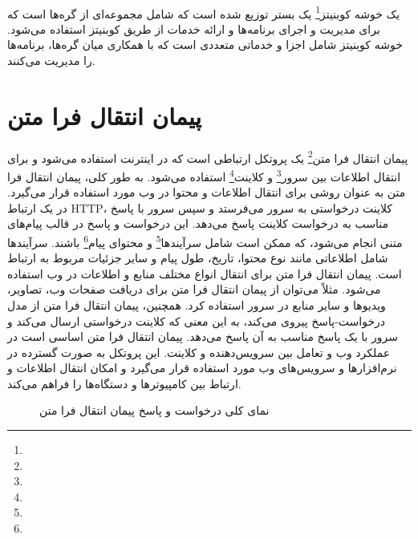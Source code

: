 \paragraph{}
{
    یک خوشه کوبنیتز\footnote{} یک بستر توزیع شده است که شامل مجموعه‌ای از گره‌ها است که برای مدیریت و اجرای برنامه‌ها و ارائه خدمات از طریق کوبنیتز استفاده می‌شود. خوشه کوبنیتز شامل اجزا و خدماتی متعددی است که با همکاری میان گره‌ها، برنامه‌ها را مدیریت می‌کنند.
}

\section{پیمان انتقال فرا متن}
\label{sec:http}
\paragraph{}
{
    پیمان انتقال فرا متن\footnote{} یک پروتکل ارتباطی است که در اینترنت استفاده می‌شود و برای انتقال اطلاعات بین سرور\footnote{} و کلاینت\footnote{} استفاده می‌شود. به طور کلی، پیمان انتقال فرا متن به عنوان روشی برای انتقال اطلاعات و محتوا در وب مورد استفاده قرار می‌گیرد. در یک ارتباط HTTP، کلاینت درخواستی به سرور می‌فرستد و سپس سرور با پاسخ مناسب به درخواست کلاینت پاسخ می‌دهد. این درخواست و پاسخ در قالب پیام‌های متنی انجام می‌شود، که ممکن است شامل سرآیندها\footnote{} و محتوای پیام\footnote{} باشند. سرآیندها شامل اطلاعاتی مانند نوع محتوا، تاریخ، طول پیام و سایر جزئیات مربوط به ارتباط است. پیمان انتقال فرا متن برای انتقال انواع مختلف منابع و اطلاعات در وب استفاده می‌شود. مثلاً می‌توان از پیمان انتقال فرا متن برای دریافت صفحات وب، تصاویر، ویدیوها و سایر منابع در سرور استفاده کرد. همچنین، پیمان انتقال فرا متن از مدل درخواست-پاسخ پیروی می‌کند، به این معنی که کلاینت درخواستی ارسال می‌کند و سرور با یک پاسخ مناسب به آن پاسخ می‌دهد. پیمان انتقال فرا متن اساسی است در عملکرد وب و تعامل بین سرویس‌دهنده و کلاینت. این پروتکل به صورت گسترده در نرم‌افزارها و سرویس‌های وب مورد استفاده قرار می‌گیرد و امکان انتقال اطلاعات و ارتباط بین کامپیوترها و دستگاه‌ها را فراهم می‌کند.
    \begin{figure}[H]
        \caption{نمای کلی درخواست و پاسخ پیمان انتقال فرا متن}
        \label{fig:http}
    \end{figure}
}

